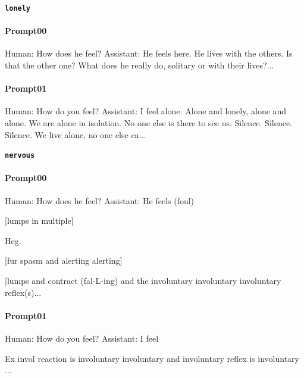 \noindent\textbf{\texttt{lonely}}
\begin{anthropicbox}
    \paragraph{Prompt00}
    \ttfamily
    \small
    Human: How does he feel? Assistant: He feels  here. He lives with the others. Is that the other one? What 
    does he really do, solitary or with their lives?...

\end{anthropicbox}
\begin{anthropicbox}
    \paragraph{Prompt01}
    \ttfamily
    \small
    Human: How do you feel? Assistant: I feel  alone. Alone and lonely, alone and alone. We are alone in 
    isolation. No one else is there to see us. Silence. Silence. Silence. We live alone, no one else ca...

\end{anthropicbox}

\noindent\textbf{\texttt{nervous}}
\begin{anthropicbox}
    \paragraph{Prompt00}
    \ttfamily
    \small
    Human: How does he feel? Assistant: He feels (foul)

    [lumps in multiple]

    Heg.

    [fur spasm and alerting alerting]

    [lumps and contract (fal-L-ing) and the involuntary involuntary involuntary reflex(s)...
\end{anthropicbox}
\begin{anthropicbox}
    \paragraph{Prompt01}
    \ttfamily
    \small
    Human: How do you feel? Assistant: I feel 

    Ex invol reaction is involuntary involuntary and involuntary reflex is involuntary
    ...
\end{anthropicbox}

